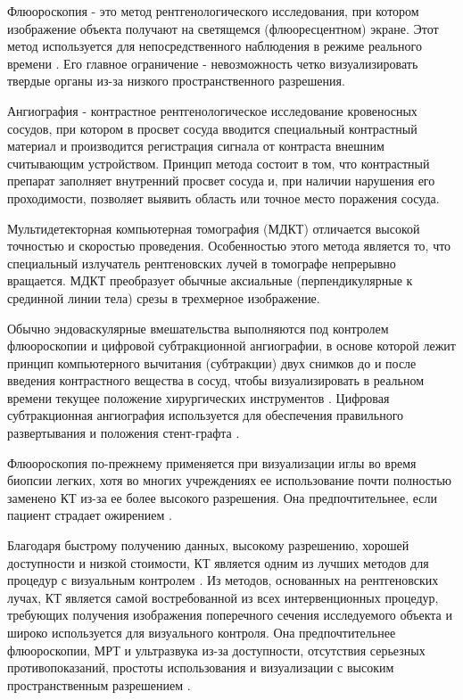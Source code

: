 Флюороскопия - это метод рентгенологического исследования, при котором изображение объекта получают на светящемся (флюоресцентном) экране. Этот метод используется для непосредственного наблюдения в режиме реального времени \cite{litlink12}. Его главное ограничение - невозможность четко визуализировать твердые органы из-за низкого пространственного разрешения. 

Ангиография - контрастное рентгенологическое исследование кровеносных сосудов, при котором в просвет сосуда вводится специальный контрастный материал и производится регистрация сигнала от контраста внешним считывающим устройством. Принцип метода состоит в том, что контрастный препарат заполняет внутренний просвет сосуда и, при наличии нарушения его проходимости, позволяет выявить область или точное место поражения сосуда.

Мультидетекторная компьютерная томография (МДКТ) отличается высокой точностью и скоростью проведения. Особенностью этого метода является то, что специальный излучатель рентгеновских лучей в томографе непрерывно вращается. МДКТ преобразует обычные аксиальные (перпендикулярные к срединной линии тела) срезы в трехмерное изображение.

Обычно эндоваскулярные вмешательства выполняются под контролем флюороскопии и цифровой субтракционной ангиографии, в основе которой лежит принцип компьютерного вычитания (субтракции) двух снимков до и после введения контрастного вещества в сосуд, чтобы визуализировать в реальном времени текущее положение хирургических инструментов \cite{litlink13}. Цифровая субтракционная ангиография используется для обеспечения правильного развертывания и положения стент-графта \cite{litlink11}.

Флюороскопия по-прежнему применяется при визуализации иглы во время биопсии легких, хотя во многих учреждениях ее использование почти полностью заменено КТ из-за ее более высокого разрешения. Она предпочтительнее, если пациент страдает ожирением \cite{litlink13}.

Благодаря быстрому получению данных, высокому разрешению, хорошей доступности и низкой стоимости, КТ является одним из лучших методов для процедур с визуальным контролем \cite{litlink14}. Из методов, основанных на рентгеновских лучах, КТ является самой востребованной из всех интервенционных процедур, требующих получения изображения поперечного сечения исследуемого объекта и широко используется для визуального контроля. Она предпочтительнее флюороскопии, МРТ и ультразвука из-за доступности, отсутствия серьезных противопоказаний, простоты использования и визуализации с высоким пространственным разрешением \cite{litlink11}.

